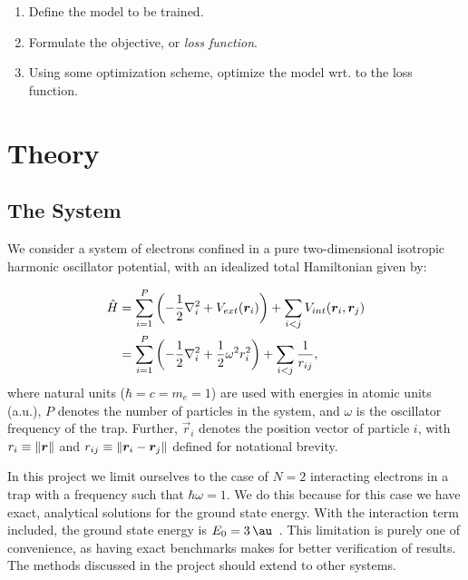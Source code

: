\documentclass[a4paper, 11pt]{article}
\begin{document}
\begin{multicols}{2}
    \begin{enumerate}
        \item Define the model to be trained.
        \item Formulate the objective, or \emph{loss function}.
        \item Using some optimization scheme, optimize the model wrt. to the
            loss function.
    \end{enumerate}


    \section{Theory}

    \subsection{The System}

    We consider a system of electrons confined in a pure two-dimensional
    isotropic harmonic oscillator potential, with an idealized total Hamiltonian
    given by:

    \begin{align}
        \begin{split}
            \hat H &= \sum_{i=1}^P\qty(-\frac{1}{2}\laplacian_i + V_{ext}(\vec r_i)) +
            \sum_{i < j} V_{int}(\vec r_i, \vec r_j)\\
            &= \sum_{i=1}^P\qty(-\frac{1}{2}\laplacian_i + \frac{1}{2}\omega^2
            r_i^2) + \sum_{i < j} \frac{1}{r_{ij}},
        \end{split}\label{eq:H-def}
    \end{align}
    where natural units ($\hbar=c=m_e=1$) are used with energies in
    atomic units (a.u.), $P$ denotes the number of particles in the system, and
    $\omega$ is the oscillator frequency of the trap. Further, $\vec r_i$
    denotes the position vector of particle $i$, with $r_i \equiv \norm{\bm r}$ and
    $r_{ij}\equiv \norm{\bm r_i - \bm r_j}$ defined for notational brevity.

    In this project we limit ourselves to the case of $N=2$ interacting
    electrons in a trap with a frequency such that $\hbar \omega = 1$. We do
    this because for this case we have exact, analytical solutions for the
    ground state energy. With the interaction term included, the ground state
    energy is $E_0 = \SI{3}{\au}$~\cite{Taut1993}. This limitation is purely one
    of convenience, as having exact benchmarks makes for better verification of
    results. The methods discussed in the project should extend to other
    systems.


\end{multicols}
\end{document}
